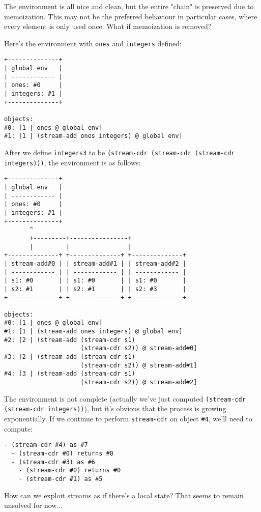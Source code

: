 \documentclass[../main.tex]{subfiles}
\begin{document}
The environment is all nice and clean, but the entire "chain" is preserved due to memoization. This may not be the preferred behaviour in particular cases, where every element is only used once. What if memoization is removed?

Here's the environment with \lstinline{ones} and \lstinline{integers} defined:

\begin{lstlisting}
+--------------+
| global env   |
| ------------ |
| ones: #0     |
| integers: #1 |
+--------------+

objects:
#0: [1 | ones @ global env]
#1: [1 | (stream-add ones integers) @ global env]
\end{lstlisting}

After we define \lstinline{integers3} to be \lstinline{(stream-cdr (stream-cdr (stream-cdr integers)))}, the environment is as follows:

\begin{lstlisting}
+--------------+
| global env   |
| ------------ |
| ones: #0     |
| integers: #1 |
+--------------+
       ^
       +---------+----------------+
       |         |                |
+--------------+ +--------------+ +--------------+ 
| stream-add#0 | | stream-add#1 | | stream-add#2 |
| ------------ | | ------------ | | ------------ |
| s1: #0       | | s1: #0       | | s1: #0       |
| s2: #1       | | s2: #1       | | s2: #3       |
+--------------+ +--------------+ +--------------+

objects:
#0: [1 | ones @ global env]
#1: [1 | (stream-add ones integers) @ global env]
#2: [2 | (stream-add (stream-cdr s1)
                     (stream-cdr s2)) @ stream-add#0]
#3: [2 | (stream-add (stream-cdr s1)
                     (stream-cdr s2)) @ stream-add#1]
#4: [3 | (stream-add (stream-cdr s1)
                     (stream-cdr s2)) @ stream-add#2]
\end{lstlisting}

The environment is not complete (actually we've just computed \lstinline{(stream-cdr (stream-cdr integers))}), but it's obvious that the process is growing exponentially. If we continue to perform \lstinline{stream-cdr} on object \lstinline{#4}, we'll need to compute:

\begin{lstlisting}
- (stream-cdr #4) as #7
  - (stream-cdr #0) returns #0
  - (stream-cdr #3) as #6
    - (stream-cdr #0) returns #0
    - (stream-cdr #1) as #5
\end{lstlisting}

How can we exploit streams as if there's a local state? That seems to remain unsolved for now...
\end{document}
